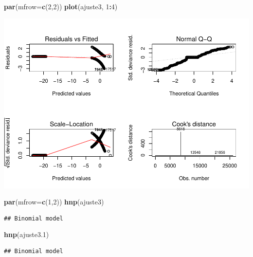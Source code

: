 \documentclass[]{article}
\newenvironment{Shaded}{\begin{snugshade}}{\end{snugshade}}
\newcommand{\KeywordTok}[1]{\textcolor[rgb]{0.13,0.29,0.53}{\textbf{#1}}}
\newcommand{\DataTypeTok}[1]{\textcolor[rgb]{0.13,0.29,0.53}{#1}}
\newcommand{\DecValTok}[1]{\textcolor[rgb]{0.00,0.00,0.81}{#1}}
\newcommand{\FloatTok}[1]{\textcolor[rgb]{0.00,0.00,0.81}{#1}}
\newcommand{\OperatorTok}[1]{\textcolor[rgb]{0.81,0.36,0.00}{\textbf{#1}}}
\newcommand{\NormalTok}[1]{#1}
\begin{document}
\begin{Shaded}
\begin{Highlighting}[]
\KeywordTok{par}\NormalTok{(}\DataTypeTok{mfrow=}\KeywordTok{c}\NormalTok{(}\DecValTok{2}\NormalTok{,}\DecValTok{2}\NormalTok{))}
\KeywordTok{plot}\NormalTok{(ajuste3, }\DecValTok{1}\OperatorTok{:}\DecValTok{4}\NormalTok{)}
\end{Highlighting}
\end{Shaded}

\includegraphics{Dados_Binários1_files/figure-latex/unnamed-chunk-16-2.pdf}

\begin{Shaded}
\begin{Highlighting}[]
\KeywordTok{par}\NormalTok{(}\DataTypeTok{mfrow=}\KeywordTok{c}\NormalTok{(}\DecValTok{1}\NormalTok{,}\DecValTok{2}\NormalTok{))}
\KeywordTok{hnp}\NormalTok{(ajuste3)}
\end{Highlighting}
\end{Shaded}

\begin{verbatim}
## Binomial model
\end{verbatim}

\begin{Shaded}
\begin{Highlighting}[]
\KeywordTok{hnp}\NormalTok{(ajuste3}\FloatTok{.1}\NormalTok{)}
\end{Highlighting}
\end{Shaded}

\begin{verbatim}
## Binomial model
\end{verbatim}
\end{document}

